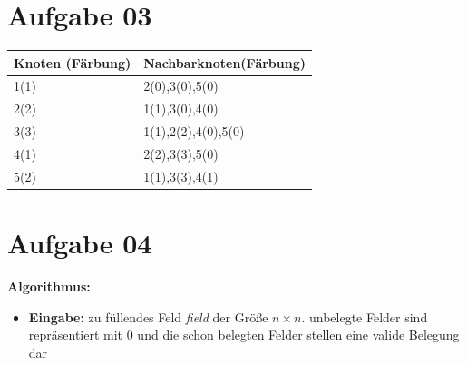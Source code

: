 \documentclass[10pt,a4paper]{article}
\begin{document}
\section*{Aufgabe 03}
    \begin{tabular}{|l |l|}
        \hline
        Knoten (Färbung) & Nachbarknoten(Färbung) \\
        \hline \hline
        1(1) & 2(0),3(0),5(0) \\ \hline
        2(2) & 1(1),3(0),4(0) \\ \hline
        3(3) & 1(1),2(2),4(0),5(0) \\ \hline
        4(1) & 2(2),3(3),5(0) \\ \hline
        5(2) & 1(1),3(3),4(1)\\ \hline
    \end{tabular}

\section*{Aufgabe 04}

    \textbf{Algorithmus:}
    \begin{itemize}
        \item \textbf{Eingabe:} zu füllendes Feld \textit{field} der Größe
            $n \times n$. unbelegte Felder sind repräsentiert mit 0 und
            die schon belegten Felder stellen eine valide Belegung dar
    \end{itemize}


    \begin{algorithm}[H]
     
        
        
    \end{algorithm}
\end{document}
